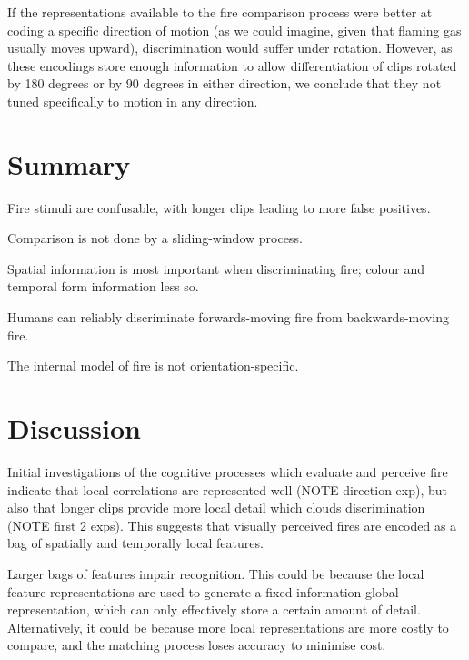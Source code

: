 \documentclass[a4paper]{article}
\begin{document}
If the representations available to the fire comparison process were better at coding a specific direction of motion (as we could imagine, given that flaming gas usually moves upward), discrimination would suffer under rotation. However, as these encodings store enough information to allow differentiation of clips rotated by 180 degrees or by 90 degrees in either direction, we conclude that they not tuned specifically to motion in any direction.

\section{Summary}

\begin{itemise}
\item Fire stimuli are confusable, with longer clips leading to more false positives.
\item Comparison is not done by a sliding-window process.
\item Spatial information is most important when discriminating fire; colour and temporal form information less so.
\item Humans can reliably discriminate forwards-moving fire from backwards-moving fire.
\item The internal model of fire is not orientation-specific.


\end{itemise}

\section{Discussion}

Initial investigations of the cognitive processes which evaluate and perceive fire indicate that local correlations are represented well (NOTE direction exp), but also that longer clips provide more local detail which clouds discrimination (NOTE first 2 exps). This suggests that visually perceived fires are encoded as a bag of spatially and temporally local features.

Larger bags of features impair recognition. This could be because the local feature representations are used to generate a fixed-information global representation, which can only effectively store a certain amount of detail. Alternatively, it could be because more local representations are more costly to compare, and the matching process loses accuracy to minimise cost.
\end{document}
